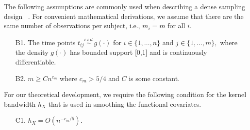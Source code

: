 \documentclass[times,sort&compress,3p]{elsarticle}
\theoremstyle{plain}%
\theoremstyle{definition}
\begin{document}

The following assumptions are commonly used when describing a dense sampling design ~\citep{Zhang+Chen:07, Li+:2010}. For convenient mathematical derivations, we assume that there are the same number of observations per subject, i.e., $m_i=m$ for all $i$. 
\begin{itemize}
	\item[B1.] The time points $t_{ij} \overset{i.i.d.}{\sim} g(\cdot)$ for $i \in \{1, \ldots, n\}$ and $j \in \{1, \ldots, m\},$ where the density $g(\cdot)$ has bounded support [0,1] and is continuously differentiable.
	\item[B2.] $m \geq C n^{c_m}$ where $c_m > 5/4$ and $C$ is some constant.  
\end{itemize}

For our theoretical development, we require the following condition for the kernel bandwidth $h_X$ that is used in smoothing the functional covariates. 
\begin{itemize}
	\item[C1.] $h_X = O(n^{-c_{m}/5})$.
\end{itemize}
\end{document}
